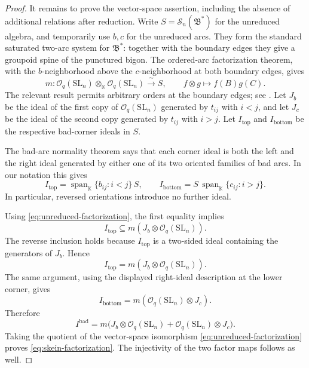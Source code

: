 \documentclass[11pt]{article}
\theoremstyle{remark}
\newcommand{\kk}{\mathbb{K}}
\newcommand{\OO}{\mathcal O_q(\mathrm{SL}_n)}
\newcommand{\Sk}{\mathscr S_n}
\newcommand{\Bstar}{\mathfrak B^{*}}
\DeclareMathOperator{\Span}{span}
\begin{document}
\begin{proof}
It remains to prove the vector-space assertion, including the
absence of additional relations after reduction.
Write $S=\Sk(\Bstar)$ for the unreduced algebra, and temporarily
use $b,c$ for the unreduced arcs.  They form the standard saturated
two-arc system for $\Bstar$: together with the boundary edges they
give a groupoid spine of the punctured bigon.  The ordered-arc
factorization theorem, with the $b$-neighborhood above the
$c$-neighborhood at both boundary edges, gives
\begin{equation}\label{eq:unreduced-factorization}
 m:\OO\otimes_\kk\OO\xrightarrow{\ \sim\ }S,\qquad
 f\otimes g\longmapsto f(B)g(C).
\end{equation}
The relevant result permits arbitrary orders at the boundary
edges; see \cite[Corollary~8.14]{LS}.
Let $J_b$ be the ideal of the first copy of $\OO$ generated by
$t_{ij}$ with $i<j$, and let $J_c$ be the ideal of the second copy
generated by $t_{ij}$ with $i>j$.
Let $I_{\mathrm{top}}$ and $I_{\mathrm{bottom}}$ be the respective
bad-corner ideals in $S$.

The bad-arc normality theorem
\cite[Theorem~7.2, especially Equation~(128)]{LY} says that each
corner ideal is both the left and the right ideal generated by
either one of its two oriented families of bad arcs.  In our
notation this gives
\[
 I_{\mathrm{top}}
   =\Span_\kk\{b_{ij}:i<j\}\,S,
 \qquad
 I_{\mathrm{bottom}}
   =S\,\Span_\kk\{c_{ij}:i>j\}.
\]
In particular, reversed orientations introduce no further ideal.


Using \eqref{eq:unreduced-factorization}, the first equality implies
\[
 I_{\mathrm{top}}\subseteq m(J_b\otimes\OO).
\]
The reverse inclusion holds because $I_{\mathrm{top}}$ is a
two-sided ideal containing the generators of $J_b$.  Hence
\[
 I_{\mathrm{top}}=m(J_b\otimes\OO).
\]
The same argument, using the displayed right-ideal description at
the lower corner, gives
\[
 I_{\mathrm{bottom}}=m(\OO\otimes J_c).
\]
Therefore
\[
 I^{\mathrm{bad}}
   =m\bigl(J_b\otimes\OO+\OO\otimes J_c\bigr).
\]
Taking the quotient of the vector-space isomorphism
\eqref{eq:unreduced-factorization} proves
\eqref{eq:skein-factorization}.  The injectivity of the two factor
maps follows as well.
\end{proof}
\end{document}
